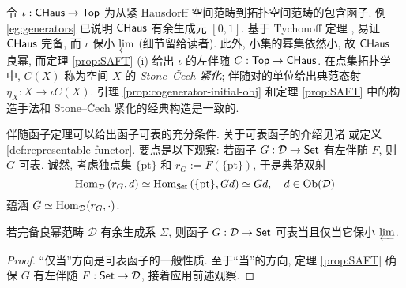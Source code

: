\begin{example}
	令 $\iota: \mathsf{CHaus} \to \mathsf{Top}$ 为从紧 Hausdorff 空间范畴到拓扑空间范畴的包含函子. 例 \ref{eg:generators} 已说明 $\mathsf{CHaus}$ 有余生成元 $[0, 1]$. 基于 Tychonoff 定理 \cite[定理 7.7.2]{Xiong}, 易证 $\mathsf{CHaus}$ 完备, 而 $\iota$ 保小 $\varprojlim$ (细节留给读者). 此外, 小集的幂集依然小, 故 $\mathsf{CHaus}$ 良幂, 而定理 \ref{prop:SAFT} (i) 给出 $\iota$ 的左伴随 $C: \mathsf{Top} \to \mathsf{CHaus}$. 在点集拓扑学中, $C(X)$ 称为空间 $X$ 的 \emph{Stone--Čech 紧化}; 伴随对的单位给出典范态射 $\eta_X: X \to \iota C(X)$. 引理 \ref{prop:cogenerator-initial-obj} 和定理 \ref{prop:SAFT} 中的构造手法和 Stone--Čech 紧化的经典构造是一致的.
\end{example}

伴随函子定理可以给出函子可表的充分条件. 关于可表函子的介绍见诸 \cite[定义 2.5.2]{Li1} 或定义 \ref{def:representable-functor}. 要点是以下观察: 若函子 $G: \mathcal{D} \to \mathsf{Set}$ 有左伴随 $F$, 则 $G$ 可表. 诚然, 考虑独点集 $\{\mathrm{pt}\}$ 和 $r_G := F(\{\mathrm{pt}\})$, 于是典范双射
\[ \operatorname{Hom}_{\mathcal{D}}\left( r_G, d \right) \simeq \operatorname{Hom}_{\mathsf{Set}}\left( \{\mathrm{pt}\}, Gd \right) \simeq Gd , \quad d \in \operatorname{Ob}(\mathcal{D}) \]
蕴涵 $G \simeq \operatorname{Hom}_{\mathcal{D}}(r_G, \cdot)$.

\begin{corollary}\label{prop:cogenerator-representability}
	若完备良幂范畴 $\mathcal{D}$ 有余生成系 $\Sigma$, 则函子 $G: \mathcal{D} \to \mathsf{Set}$ 可表当且仅当它保小 $\varprojlim$.
\end{corollary}
\begin{proof}
	``仅当''方向是可表函子的一般性质. 至于``当''的方向, 定理 \ref{prop:SAFT} 确保 $G$ 有左伴随 $F: \mathsf{Set} \to \mathcal{D}$, 接着应用前述观察.
\end{proof}

